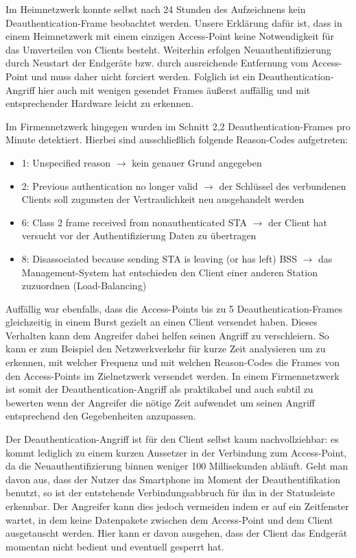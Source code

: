 Im Heimnetzwerk konnte selbst nach 24 Stunden des Aufzeichnens kein Deauthentication-Frame beobachtet werden.
Unsere Erklärung dafür ist, dass in einem Heimnetzwerk mit einem einzigen Access-Point keine Notwendigkeit für das Umverteilen von Clients besteht.
Weiterhin erfolgen Neuauthentifizierung durch Neustart der Endgeräte bzw. durch ausreichende Entfernung vom Access-Point und muss daher nicht forciert werden.
Folglich ist ein Deauthentication-Angriff hier auch mit wenigen gesendet Frames äußerst auffällig und mit entsprechender Hardware leicht zu erkennen.

Im Firmennetzwerk hingegen wurden im Schnitt 2,2 Deauthentication-Frames pro Minute detektiert.
Hierbei sind ausschließlich folgende Reason-Codes aufgetreten:
\begin{itemize}
	\item 1: Unspecified reason $\rightarrow$ kein genauer Grund angegeben
	\item 2: Previous authentication no longer valid $\rightarrow$ der Schlüssel des verbundenen Clients soll zugunsten der Vertraulichkeit neu ausgehandelt werden
	\item 6: Class 2 frame received from nonauthenticated STA $\rightarrow$ der Client hat versucht vor der Authentifizierung Daten zu übertragen
	\item 8: Disassociated because sending STA is leaving (or has left) BSS $\rightarrow$ das Management-System hat entschieden den Client einer anderen Station zuzuordnen (Load-Balancing)
\end{itemize}
Auffällig war ebenfalls, dass die Access-Points bis zu 5 Deauthentication-Frames gleichzeitig in einem Burst gezielt an einen Client versendet haben.
Dieses Verhalten kann dem Angreifer dabei helfen seinen Angriff zu verschleiern.
So kann er zum Beispiel den Netzwerkverkehr für kurze Zeit analysieren um zu erkennen, mit welcher Frequenz und mit welchen Reason-Codes die Frames von den Access-Points im Zielnetzwerk versendet werden.
In einem Firmennetzwerk ist somit der Deauthentication-Angriff als praktikabel und auch subtil zu bewerten wenn der Angreifer die nötige Zeit aufwendet um seinen Angriff entsprechend den Gegebenheiten anzupassen.

Der Deauthentication-Angriff ist für den Client selbst kaum nachvollziehbar: es kommt lediglich zu einem kurzen Aussetzer in der Verbindung zum Access-Point, da die Neuauthentifizierung binnen weniger 100 Millisekunden abläuft.
Geht man davon aus, dass der Nutzer das Smartphone im Moment der Deauthentifikation benutzt, so ist der entstehende Verbindungsabbruch für ihn in der Statusleiste erkennbar.
Der Angreifer kann dies jedoch vermeiden indem er auf ein Zeitfenster wartet, in dem keine Datenpakete zwischen dem Access-Point und dem Client ausgetauscht werden.
Hier kann er davon ausgehen, dass der Client das Endgerät momentan nicht bedient und eventuell gesperrt hat.

